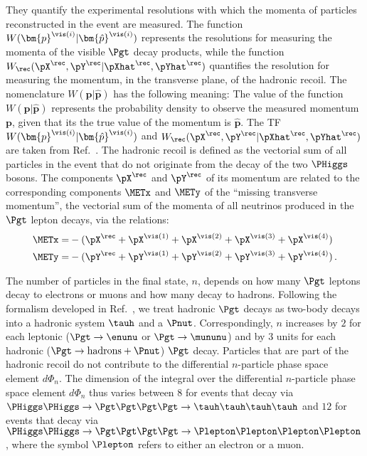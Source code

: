 They quantify the experimental resolutions with which the momenta of particles reconstructed in the event are measured.
The function $W(\bm{p}^{\vis(i)}|\bm{\hat{p}}^{\vis(i)})$ represents the resolutions for measuring the momenta of the visible $\Pgt$ decay products,
while the function $W_{\rec}( \pX^{\rec},\pY^{\rec} | \pXhat^{\rec},\pYhat^{\rec} )$ quantifies the resolution for measuring the momentum, in the transverse plane, of the hadronic recoil.
The nomenclature $W(\bm{p}|\bm{\hat{p}})$ has the following meaning:
The value of the function $W(\bm{p}|\bm{\hat{p}})$ represents the probability density to observe the measured momentum $\bm{p}$,
given that its the true value of the momentum is $\bm{\hat{p}}$.
The TF $W(\bm{p}^{\vis(i)}|\bm{\hat{p}}^{\vis(i)})$ and $W_{\rec}( \pX^{\rec},\pY^{\rec} | \pXhat^{\rec},\pYhat^{\rec} )$ are taken from Ref.~\cite{SVfitMEM}.
The hadronic recoil is defined as the vectorial sum of all particles in the event that do not originate from the decay of the two $\PHiggs$ bosons.
The components $\pX^{\rec}$ and $\pY^{\rec}$ of its momentum are related to the corresponding components $\METx$ and $\METy$ of the ``missing transverse momentum'',
the vectorial sum of the momenta of all neutrinos produced in the $\Pgt$ lepton decays, via the relations:
\begin{align}
\METx = & -( \pX^{\rec} + \pX^{\vis(1)} + \pX^{\vis(2)} + \pX^{\vis(3)} + \pX^{\vis(4)} ) \nonumber \\
\METy = & -( \pY^{\rec} + \pY^{\vis(1)} + \pY^{\vis(2)} + \pY^{\vis(3)} + \pY^{\vis(4)} ) \nonumber \, .
\end{align}

The number of particles in the final state, $n$, depends on how many $\Pgt$ leptons decay to electrons or muons 
and how many decay to hadrons.
Following the formalism developed in Ref.~\cite{SVfitMEM}, 
we treat hadronic $\Pgt$ decays as two-body decays into a hadronic system $\tauh$ and a $\Pnut$.
Correspondingly, $n$ increases by $2$ for each leptonic ($\Pgt \to \enunu$ or $\Pgt \to \mununu$) and by $3$ units for each hadronic ($\Pgt \to \textrm{hadrons} + \Pnut$) $\Pgt$ decay.
Particles that are part of the hadronic recoil do not contribute to the differential $n$-particle phase space element $d\Phi_{n}$.
The dimension of the integral over the differential $n$-particle phase space element $d\Phi_{n}$ thus
varies between $8$ for events that decay via $\PHiggs\PHiggs \to \Pgt\Pgt\Pgt\Pgt \to \tauh\tauh\tauh\tauh$ 
and $12$ for events that decay via $\PHiggs\PHiggs \to \Pgt\Pgt\Pgt\Pgt \to \Plepton\Plepton\Plepton\Plepton$,
where the symbol $\Plepton$ refers to either an electron or a muon.

